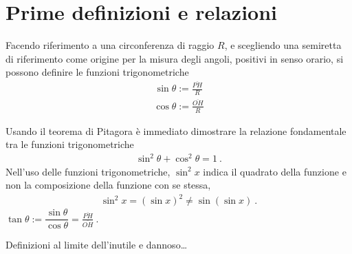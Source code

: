 \documentclass[letterpaper,10pt,english]{jupyterBook}
\begin{document}
\section{Prime definizioni e relazioni}
\label{\detokenize{ch/trigonometry:prime-definizioni-e-relazioni}}
\sphinxAtStartPar
Facendo riferimento a una circonferenza di raggio \(R\), e scegliendo una semiretta di riferimento come origine per la misura degli angoli, positivi in senso orario, si possono definire le funzioni trigonometriche
\begin{equation*}
\begin{split}\sin \theta := \frac{\overline{PH}}{R}\end{split}
\end{equation*}\begin{equation*}
\begin{split}\cos \theta := \frac{\overline{OH}}{R}\end{split}
\end{equation*}
\sphinxAtStartPar
{}

\sphinxAtStartPar
Usando il teorema di Pitagora è immediato dimostrare la relazione fondamentale tra le funzioni trigonometriche
\begin{equation*}
\begin{split}\sin^2 \theta + \cos^2 \theta = 1 \ .\end{split}
\end{equation*}
\sphinxAtStartPar
{} Nell’uso delle funzioni trigonometriche, \(\sin^2 x\) indica il quadrato della funzione e non la composizione della funzione con se stessa,
\begin{equation*}
\begin{split}\sin^2 x = (\sin x)^2 \neq \sin( \sin x) \ .\end{split}
\end{equation*}
\sphinxAtStartPar
{} \(\tan \theta := \dfrac{\sin \theta}{\cos \theta} = \frac{\overline{PH}}{\overline{OH}} \ .\)

\sphinxAtStartPar
{} Definizioni al limite dell’inutile e dannoso…
\end{document}
